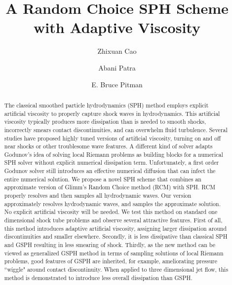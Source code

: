 \documentclass[review]{elsarticle}
\begin{document}
\begin{frontmatter}
\title{A Random Choice SPH Scheme with Adaptive Viscosity}
\author{Zhixuan Cao}
\author{Abani Patra }
\address{Department of Mechanical and Aerospace Engineering, The State University of New York at Buffalo, Amherst, NY, 14260-4200, USA}
\author{E. Bruce Pitman}
\address{Department of Materials Design and Innovation, The State University of New York at Buffalo, Amherst, NY, 14260-4200, USA}

\begin{abstract}
The classical smoothed particle hydrodynamics (SPH) method employs explicit artificial viscosity to properly capture shock waves in hydrodynamics. This artificial viscosity typically produces more dissipation than is needed to smooth shocks, incorrectly smears contact discontinuities, and can overwhelm fluid turbulence. 
Several studies have proposed highly tuned versions of artificial viscosity, turning on and off near shocks or other troublesome wave features.
A different kind of solver adapts Godunov\rq{}s idea of solving local Riemann problems as building blocks for a numerical SPH solver without explicit numerical dissipation term. Unfortunately, a first order Godunov solver still introduces an effective numerical diffusion that can infect the entire numerical solution.
We propose a novel SPH scheme that combines an approximate version of Glimm\rq{}s Random Choice method (RCM) with SPH. RCM properly resolves and then samples all hydrodynamic waves. Our version approximately resolves hydrodynamic waves, and samples the approximate solution. No explicit artificial viscosity will be needed.
We test this method on standard one dimensional shock tube problems and observe several attractive features. First of all, this method introduces adaptive artificial viscosity, assigning larger dissipation around discontinuities and smaller elsewhere. Secondly, it is less dissipative than classical SPH and GSPH resulting in less smearing of shock. Thirdly, as the new method can be viewed as generalized GSPH method in terms of sampling solutions of local Riemann problems, good features of GSPH are inherited, for example, ameliorating pressure ``wiggle" around contact discontinuity.
When applied to three dimensional jet flow, this method is demonstrated to introduce less overall dissipation than GSPH.


\end{abstract}
\end{frontmatter}
\end{document}
